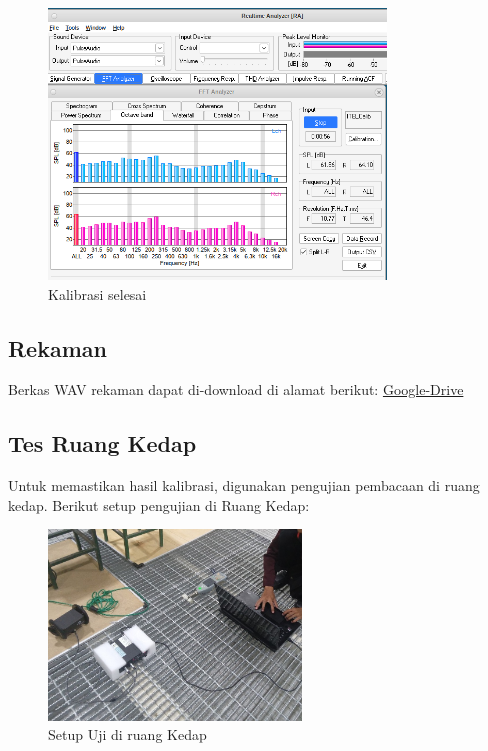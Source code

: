 \documentclass{article}
\begin{document}
\begin{itemize}
		\begin{figure}[H]
			\centering
			\includegraphics[width=0.8\textwidth,angle=0]{images/rta_fft}
			\caption{Kalibrasi selesai}
		\end{figure}
		
	\end{itemize}
	
	\newpage
	\subsection{Rekaman}
	
	Berkas WAV rekaman dapat di-download di alamat berikut: \href{https://drive.google.com/drive/folders/18bjBI3CSgyAX_4-f_cD2AvmgAtwJ-hkF}{Google-Drive}

	\subsection{Tes Ruang Kedap}
	
	Untuk memastikan hasil kalibrasi, digunakan pengujian pembacaan di ruang kedap.
	Berikut setup pengujian di Ruang Kedap:
	
	\begin{figure}[H]
		\centering
		\includegraphics[width=0.6\textwidth,angle=0]{images/tes_kedap}
		\caption{Setup Uji di ruang Kedap}
	\end{figure}
	
\end{document}
